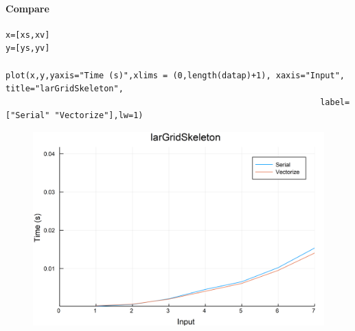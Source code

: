 \documentclass{article}
\begin{document}
\paragraph{Compare}
\begin{flushleft}\small
\begin{list}{}{} \item
    \begin{Verbatim}[tabsize=4]
x=[xs,xv]
y=[ys,yv]

plot(x,y,yaxis="Time (s)",xlims = (0,length(datap)+1), xaxis="Input", title="larGridSkeleton",
                                                                label=["Serial" "Vectorize"],lw=1)
    \end{Verbatim}
\end{list}
\end{flushleft}   
\begin{figure}[h!]
\centering
\includegraphics[scale=0.06]{larGridSkeletonCom1.png}
\end{figure}
\end{document}
